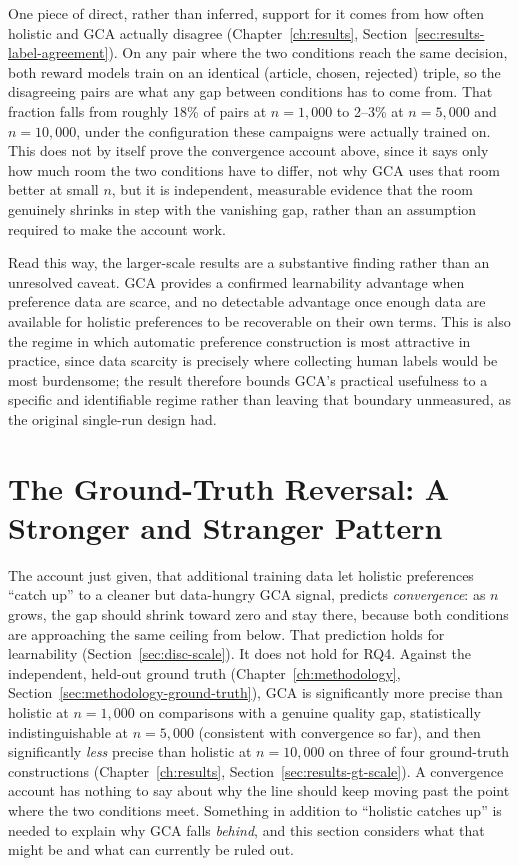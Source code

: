 One piece of direct, rather than inferred, support for it comes from how
often holistic and GCA actually disagree
(Chapter~\ref{ch:results}, Section~\ref{sec:results-label-agreement}). On
any pair where the two conditions reach the same decision, both reward
models train on an identical (article, chosen, rejected) triple, so the
disagreeing pairs are what any gap between conditions has to come from.
That fraction falls from roughly 18\% of pairs at $n=1{,}000$ to 2--3\% at
$n=5{,}000$ and $n=10{,}000$, under the configuration these campaigns were
actually trained on. This does not by itself prove the convergence
account above, since it says only how much room the two conditions have to
differ, not why GCA uses that room better at small $n$, but it is
independent, measurable evidence that the room genuinely shrinks in step
with the vanishing gap, rather than an assumption required to make the
account work.

Read this way, the larger-scale results are a substantive finding rather than
an unresolved caveat. GCA provides a confirmed learnability advantage when
preference data are scarce, and no detectable advantage once enough data are
available for holistic preferences to be recoverable on their own terms. This
is also the regime in which automatic preference construction is most
attractive in practice, since data scarcity is precisely where collecting
human labels would be most burdensome; the result therefore bounds GCA's
practical usefulness to a specific and identifiable regime rather than leaving
that boundary unmeasured, as the original single-run design had.

\section{The Ground-Truth Reversal: A Stronger and Stranger Pattern}
\label{sec:disc-gt-reversal}

The account just given, that additional training data let holistic
preferences ``catch up'' to a cleaner but data-hungry GCA signal, predicts
\emph{convergence}: as $n$ grows, the gap should shrink toward zero and stay
there, because both conditions are approaching the same ceiling from below.
That prediction holds for learnability (Section~\ref{sec:disc-scale}). It
does not hold for RQ4. Against the independent, held-out ground truth
(Chapter~\ref{ch:methodology}, Section~\ref{sec:methodology-ground-truth}),
GCA is significantly more precise than holistic at $n=1{,}000$ on
comparisons with a genuine quality gap, statistically indistinguishable at
$n=5{,}000$ (consistent with convergence so far), and then
significantly \emph{less} precise than holistic at $n=10{,}000$ on three of
four ground-truth constructions (Chapter~\ref{ch:results},
Section~\ref{sec:results-gt-scale}). A convergence account has nothing to
say about why the line should keep moving past the point where the two
conditions meet. Something in addition to ``holistic catches up'' is needed
to explain why GCA falls \emph{behind}, and this section considers what that
might be and what can currently be ruled out.

